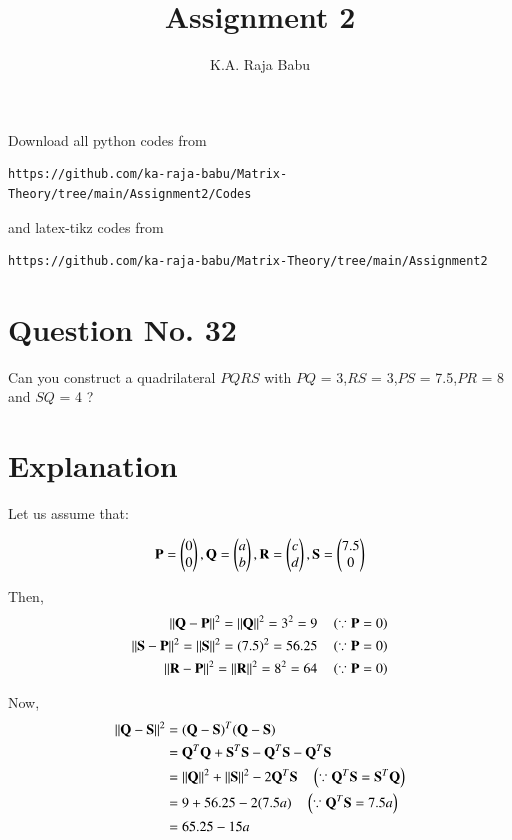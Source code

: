 \documentclass[journal,12pt,twocolumn]{IEEEtran}
\begin{document}
     \def\rightbox#1{\makebox[0in][r]{#1}}
     \def\centbox#1{\makebox[0in]{#1}}
     \def\topbox#1{\raisebox{-\baselineskip}[0in][0in]{#1}}
     \def\midbox#1{\raisebox{-0.5\baselineskip}[0in][0in]{#1}}
\vspace{3cm}
\title{Assignment 2}
\author{K.A. Raja Babu}
\maketitle
\newpage
\bigskip
\renewcommand{\thefigure}{\theenumi}
\renewcommand{\thetable}{\theenumi}
Download all python codes from 
\begin{lstlisting}
https://github.com/ka-raja-babu/Matrix-Theory/tree/main/Assignment2/Codes
\end{lstlisting}
%
and latex-tikz codes from 
%
\begin{lstlisting}
https://github.com/ka-raja-babu/Matrix-Theory/tree/main/Assignment2
\end{lstlisting}
%
\section{Question No. 32}
Can you construct a quadrilateral $PQRS$ with $PQ$ = 3,$RS$ = 3,$PS$ = 7.5,$PR$ = 8 and $SQ$ = 4 ?
%

\section{Explanation}
Let us assume that:

\begin{align}
\mathbf{P} = \begin{pmatrix}0\\0\end{pmatrix}, \mathbf{Q} = \begin{pmatrix}a\\b\end{pmatrix}, \mathbf{R} = \begin{pmatrix}c\\d\end{pmatrix},\mathbf{S} = \begin{pmatrix}7.5\\0\end{pmatrix}
\end{align}

Then,
\begin{align}
\left\lVert\mathbf{Q}-\mathbf{P}\right\rVert^2 = \left\lVert\mathbf{Q}\right\rVert^2  = 3^2 =9 \quad \left(\because \mathbf{P}=0\right) 
\\
\left\lVert\mathbf{S}-\mathbf{P}\right\rVert^2 = \left\lVert\mathbf{S}\right\rVert^2 = (7.5)^2 =56.25 \quad \left(\because \mathbf{P}=0\right) 
\\
\left\lVert\mathbf{R}-\mathbf{P}\right\rVert^2 = \left\lVert\mathbf{R}\right\rVert^2 = 8^2 = 64 \quad \left(\because \mathbf{P}=0\right) 
\end{align}

Now,
\begin{align}
\left\lVert\mathbf{Q}-\mathbf{S}\right\rVert^2 &= ({\mathbf{Q}-\mathbf{S}})^T({\mathbf{Q}-\mathbf{S}})
\\
&= \mathbf{Q}^T\mathbf{Q}+\mathbf{S}^T\mathbf{S}-\mathbf{Q}^T\mathbf{S} - \mathbf{Q}^T\mathbf{S}
\\
&= \left\lVert\mathbf{Q}\right\rVert^2 + \left\lVert\mathbf{S}\right\rVert^2 - 2\mathbf{Q}^T\mathbf{S} \quad \left(\because \mathbf{Q}^T\mathbf{S} = \mathbf{S}^T\mathbf{Q} \right) 
\\
&= 9 + 56.25 -2(7.5a) \quad \left(\because \mathbf{Q}^T\mathbf{S} = 7.5a \right) 
\\
&= 65.25 - 15a
\end{align}
\end{document}
